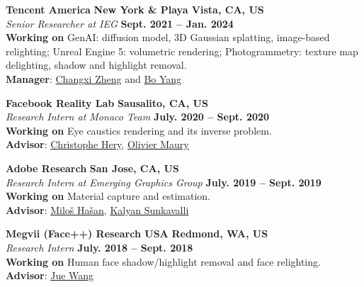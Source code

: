 \documentclass[margin,line]{resume}
\begin{document}
\begin{resume}
	\textbf{Tencent America} \hfill \textbf{New York \& Playa Vista, CA, US} \\
	\textsl{Senior Researcher at IEG} \hfill \textbf{Sept. 2021 -- Jan. 2024}\\
	\textbf{Working on} GenAI: diffusion model, 3D Gaussian splatting, image-based relighting; Unreal Engine 5: volumetric rendering; Photogrammetry: texture map delighting, shadow and highlight removal.\\
	\textbf{Manager}: \href{https://www.cs.columbia.edu/~cxz/}{Changxi Zheng} and  \href{https://sites.google.com/site/boyanghome/home}{Bo Yang}
	
	\vspace{0.0mm}

	\textbf{Facebook Reality Lab} \hfill \textbf{Sausalito, CA, US} \\
	\textsl{Research Intern at Monaco Team} \hfill \textbf{July. 2020 -- Sept. 2020}\\
	\textbf{Working on} Eye caustics rendering and its inverse problem.\\
	\textbf{Advisor}: \href{https://graphics.pixar.com/library/indexAuthorChristophe_Hery.html}{Christophe Hery}, \href{https://www.imdb.com/name/nm1436524/}{Olivier Maury}       

    \vspace{0.0mm}

	\textbf{Adobe Research} \hfill \textbf{San Jose, CA, US} \\
	\textsl{Research Intern at Emerging Graphics Group} \hfill \textbf{July. 2019 -- Sept. 2019}\\
	\textbf{Working on} Material capture and estimation.\\
	\textbf{Advisor}: \href{http://miloshasan.net/}{Milo\v{s} Ha\v{s}an}, \href{https://research.adobe.com/person/kalyan-sunkavalli/}{Kalyan Sunkavalli}       

    \vspace{0.0mm}

	\textbf{Megvii (Face++) Research USA} \hfill \textbf{Redmond, WA, US} \\
	\textsl{Research Intern} \hfill \textbf{July. 2018 -- Sept. 2018}\\
	\textbf{Working on} Human face shadow/highlight removal and face relighting.\\
	\textbf{Advisor}: \href{https://www.juew.org/}{Jue Wang}        

    \vspace{0.0mm}


\end{resume}
\end{document}
